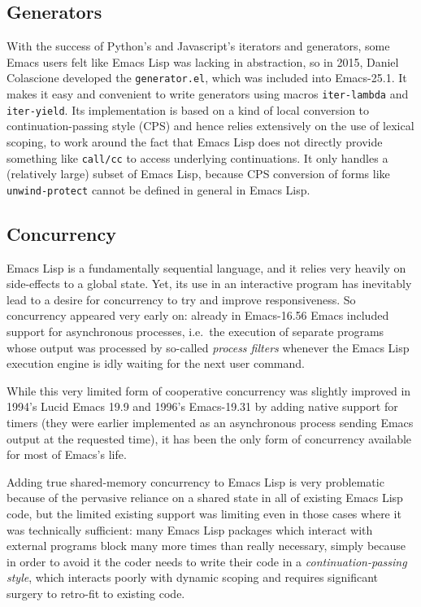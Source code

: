\documentclass[format=acmsmall, review]{acmart}
\newcommand \Elisp {Emacs Lisp}
\begin{document}
\subsection{Generators}
\label{sec:generators}

With the success of Python's and Javascript's iterators and generators, some
Emacs users felt like \Elisp{} was lacking in abstraction, so in 2015,
Daniel Colascione developed the \texttt{generator.el}, which was included
into Emacs-25.1.  It makes it easy and convenient to write generators using
macros \texttt{iter-lambda} and \texttt{iter-yield}.  Its implementation is
based on a kind of local conversion to continuation-passing style (CPS) and
hence relies extensively on the use of lexical scoping, to work around the
fact that \Elisp{} does not directly provide something like \texttt{call/cc}
to access underlying continuations.  It only handles a (relatively large)
subset of \Elisp{}, because CPS conversion of forms like
\texttt{unwind-protect} cannot be defined in general in \Elisp.

\subsection{Concurrency}
\label{sec:concurrency}

\Elisp{} is a fundamentally sequential language, and it relies very heavily
on side-effects to a global state.  Yet, its use in an interactive program
has inevitably lead to a desire for concurrency to try and improve
responsiveness.  So concurrency appeared very early on: already in
Emacs-16.56 Emacs included support for asynchronous processes, i.e.~the
execution of separate programs whose output was processed by so-called
\emph{process filters} whenever the \Elisp{} execution engine is idly
waiting for the next user command.

While this very limited form of cooperative concurrency was slightly
improved in 1994's Lucid Emacs 19.9 and 1996's Emacs-19.31 by adding native support for timers (they
were earlier implemented as an asynchronous process sending Emacs output at
the requested time), it has been the only form of concurrency available for
most of Emacs's life.

Adding true shared-memory concurrency to \Elisp{} is very problematic
because of the pervasive reliance on a shared state in all of existing
\Elisp{} code, but the limited existing support was limiting even in those
cases where it was technically sufficient: many \Elisp{} packages which
interact with external programs block many more times than really necessary,
simply because in order to avoid it the coder needs to write their code in
a \emph{continuation-passing style}, which interacts poorly with dynamic
scoping and requires significant surgery to retro-fit to existing code.
\end{document}
